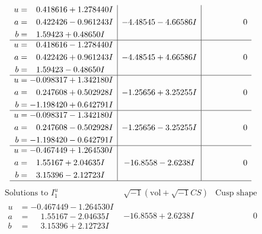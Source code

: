 \documentclass[1p]{elsarticle_modified}
\theoremstyle{definition}
\newcommand{\I}{\sqrt{-1}}
\begin{document}
$$\begin{array}{c|c|c}
\begin{aligned}
u &= \phantom{-}0.418616 + 1.278440 I \\
a &= \phantom{-}0.422426 - 0.961243 I \\
b &= \phantom{-}1.59423 + 0.48650 I\end{aligned}
 & -4.48545 - 4.66586 I & \phantom{-0.000000 } 0 \\ \hline\begin{aligned}
u &= \phantom{-}0.418616 - 1.278440 I \\
a &= \phantom{-}0.422426 + 0.961243 I \\
b &= \phantom{-}1.59423 - 0.48650 I\end{aligned}
 & -4.48545 + 4.66586 I & \phantom{-0.000000 } 0 \\ \hline\begin{aligned}
u &= -0.098317 + 1.342180 I \\
a &= \phantom{-}0.247608 + 0.502928 I \\
b &= -1.198420 + 0.642791 I\end{aligned}
 & -1.25656 + 3.25255 I & \phantom{-0.000000 } 0 \\ \hline\begin{aligned}
u &= -0.098317 - 1.342180 I \\
a &= \phantom{-}0.247608 - 0.502928 I \\
b &= -1.198420 - 0.642791 I\end{aligned}
 & -1.25656 - 3.25255 I & \phantom{-0.000000 } 0 \\ \hline\begin{aligned}
u &= -0.467449 + 1.264530 I \\
a &= \phantom{-}1.55167 + 2.04635 I \\
b &= \phantom{-}3.15396 - 2.12723 I\end{aligned}
 & -16.8558 - 2.6238 I & \phantom{-0.000000 } 0\\
 \hline 
 \end{array}$$\newpage$$\begin{array}{c|c|c}  
\text{Solutions to }I^u_{1}& \I (\text{vol} + \sqrt{-1}CS) & \text{Cusp shape}\\
 \hline 
\begin{aligned}
u &= -0.467449 - 1.264530 I \\
a &= \phantom{-}1.55167 - 2.04635 I \\
b &= \phantom{-}3.15396 + 2.12723 I\end{aligned}
 & -16.8558 + 2.6238 I & \phantom{-0.000000 } 0 \\ \hline\begin{aligned}

\end{aligned}
\end{array}$$
\end{document}
